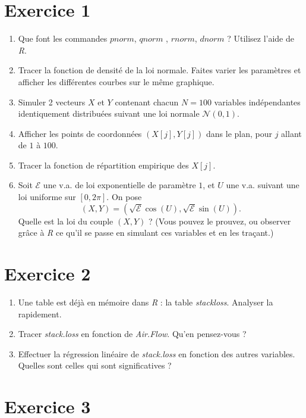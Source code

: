 \section*{Exercice 1}
\begin{enumerate}
\item Que font les commandes $pnorm$, $qnorm$ , $rnorm$, $dnorm$ ? Utilisez l'aide de \textit{R}.
\item Tracer la fonction de densité de la loi normale. Faites varier les paramètres et afficher les différentes courbes sur le même graphique. 
\item Simuler 2 vecteurs $X$ et $Y$ contenant chacun $N=100$ variables indépendantes identiquement distribuées suivant une loi normale $\mathcal N (0,1)$.
\item Afficher les points de coordonnées $(X[j],Y[j])$ dans le plan, pour $j$ allant de $1$ à $100$.
\item Tracer la fonction de répartition empirique des $X[j]$.
\item Soit $\mathcal E$ une v.a. de loi exponentielle de paramètre $1$, et $U$ une v.a. suivant une loi uniforme sur $[0,2\pi]$. On pose 
\[(X,Y)=(\sqrt{\mathcal E}\cos (U), \sqrt{\mathcal E} \sin (U)).\]
Quelle est la loi du couple $(X,Y)$ ? (Vous pouvez le prouvez, ou observer grâce à \textit{R} ce qu'il se passe en simulant ces variables et en les traçant.)
\end{enumerate}

\section*{Exercice 2}

\begin{enumerate}
\item Une table est déjà en mémoire dans \textit{R} : la table \textit{stackloss}. Analyser la rapidement.
\item Tracer \textit{stack.loss} en fonction de \textit{Air.Flow}. Qu'en pensez-vous ?
\item Effectuer la régression linéaire de \textit{stack.loss} en fonction des autres variables. Quelles sont celles qui sont significatives ?
\end{enumerate}

\section*{Exercice 3}

